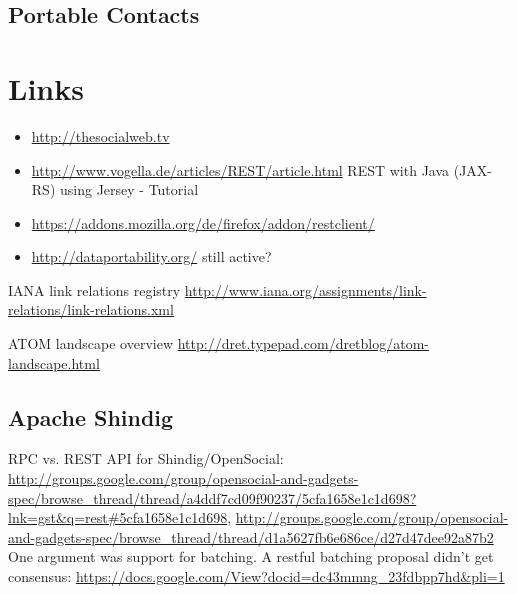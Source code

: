 \documentclass[12pt,a4paper]{scrartcl}		%
\begin{document}
\subsection{Portable Contacts}

\section{Links}

\begin{itemize}
\item \url{http://thesocialweb.tv}
\item \url{http://www.vogella.de/articles/REST/article.html} REST with Java (JAX-RS) using Jersey - Tutorial
\item \url{https://addons.mozilla.org/de/firefox/addon/restclient/}
\item \url{http://dataportability.org/} still active?

\end{itemize}

IANA link relations registry \url{http://www.iana.org/assignments/link-relations/link-relations.xml}

ATOM landscape overview \url{http://dret.typepad.com/dretblog/atom-landscape.html}

\subsection{Apache Shindig}
RPC vs. REST API for Shindig/OpenSocial: \url{http://groups.google.com/group/opensocial-and-gadgets-spec/browse_thread/thread/a4ddf7cd09f90237/5cfa1658e1c1d698?lnk=gst&q=rest#5cfa1658e1c1d698}, \url{http://groups.google.com/group/opensocial-and-gadgets-spec/browse_thread/thread/d1a5627fb6e686ce/d27d47dee92a87b2} One argument was support for batching. A restful batching proposal didn't get consensus: \url{https://docs.google.com/View?docid=dc43mmng_23fdbpp7hd&pli=1}
\end{document}
